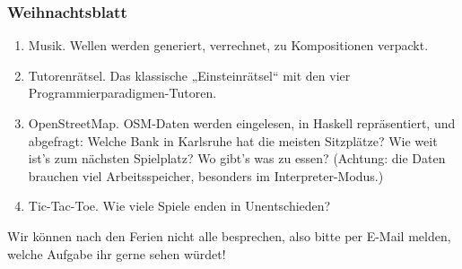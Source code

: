 \documentclass{beamer}
\begin{document}
\begin{frame}
  \frametitle{Weihnachtsblatt}
  \begin{enumerate}
  \item Musik.
    Wellen werden generiert, verrechnet, zu Kompositionen verpackt.
  \item Tutorenrätsel.
    Das klassische „Einsteinrätsel“ mit den vier Programmierparadigmen-Tutoren.
  \item OpenStreetMap.
    OSM-Daten werden eingelesen, in Haskell repräsentiert, und abgefragt:
    Welche Bank in Karlsruhe hat die meisten Sitzplätze?
    Wie weit ist’s zum nächsten Spielplatz?
    Wo gibt’s was zu essen?
    (Achtung: die Daten brauchen viel Arbeitsspeicher,
    besonders im Interpreter-Modus.)
  \item Tic-Tac-Toe.
    Wie viele Spiele enden in Unentschieden?
  \end{enumerate}
  Wir können nach den Ferien nicht alle besprechen, also bitte per E-Mail melden, welche Aufgabe ihr gerne sehen würdet!
\end{frame}
\end{document}

